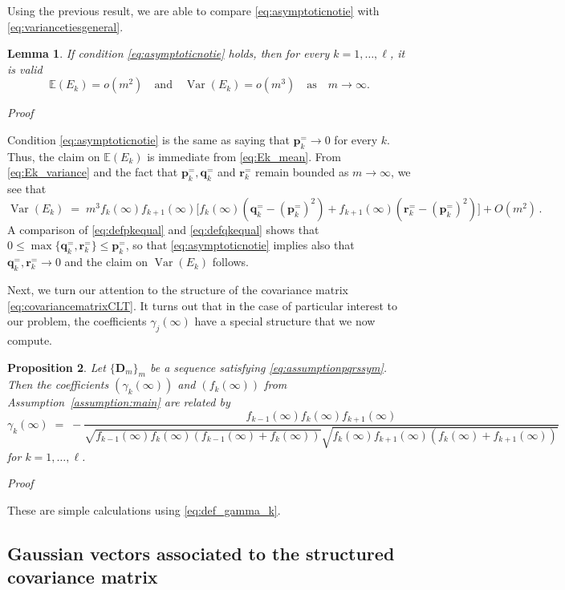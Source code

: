 \documentclass[reqno,a4paper,11pt]{amsart}
\makeatletter
\newtheorem{lemma}{Lemma}
\newtheorem{proposition}[lemma]{Proposition}
\theoremstyle{remark}
\newcommand{\mb}[1]{{\mathbf #1}}
\newcommand{\bb}[1]{{\mathbb #1}}
\numberwithin{equation}{section}
\newcommand{\var}[1]{\operatorname{Var}\left(#1\right)}
\renewenvironment{proof}[1][Proof]{\par
\pushQED{\qed}%
\normalfont \topsep6\p@\@plus6\p@\relax
\trivlist
\item\relax
{\itshape
#1\@addpunct{.}}\hspace\labelsep\ignorespaces
}{%
\popQED\endtrivlist\@endpefalse
}
\makeatother
\begin{document}
Using the previous result, we are able to compare \eqref{eq:asymptoticnotie} with \eqref{eq:variancetiesgeneral}.

\begin{lemma}\label{lem:notiemeanvariance}
If condition \eqref{eq:asymptoticnotie} holds, then for every $k=1,\hdots,\ell$, it is valid
$$
\bb E(E_k)= o(m^2)  \quad \text{and}\quad \var{E_k}= o(m^3) \quad \text{as}\quad m\to \infty.
$$
\end{lemma}
\begin{proof}
Condition \eqref{eq:asymptoticnotie} is the same as saying that $\bm p_k^=\to 0$ for every $k$. Thus, the claim on $\bb E(E_k)$ is immediate from \eqref{eq:Ek_mean}.
From \eqref{eq:Ek_variance} and the fact that $\mb p_k^=, \mb q_k^=$ and $\mb r_k^=$ remain bounded as $m\to\infty$, we see that
%
$$
\var{E_k}\;=\;
m^3 f_k(\infty)f_{k+1}(\infty)
\bigl[f_k(\infty)(\mb q_k^=-(\mb p_k^=)^2) + f_{k+1}(\infty)(\mb r_k^=-(\mb p_k^=)^2)\bigr]+O(m^2)\,.
$$
%
A comparison of \eqref{eq:defpkequal} and \eqref{eq:defqkequal} shows that $0\leq \max\{\mb q_k^=, \mb r_k^= \}\leq \mb p_k^=$, so that \eqref{eq:asymptoticnotie} implies also that $\mb q_k^=, \mb r_k^= \to 0$ and the claim on $\var{E_k}$ follows.
\end{proof}

Next, we turn our attention to the structure of the covariance matrix \eqref{eq:covariancematrixCLT}. It turns out that in the case of particular interest to our problem, the coefficients $\gamma_j(\infty)$ have a special structure that we now compute.

\begin{proposition}\label{prop:coeffgammak}
Let $\{\mb D_m\}_m$ be a sequence satisfying \eqref{eq:assumptionpqrssym}. Then the coefficients $(\gamma_k(\infty))$ and $(f_k(\infty))$ from Assumption~\ref{assumption:main} are related by
%
$$
\gamma_k(\infty)\;=\;-\frac{f_{k-1}(\infty)f_k(\infty)f_{k+1}(\infty)}{\sqrt{f_{k-1}(\infty)f_k(\infty)(f_{k-1}(\infty)+f_{k}(\infty))}\sqrt{f_{k}(\infty)f_{k+1}(\infty)(f_{k}(\infty)+f_{k+1}(\infty))}}
$$
%
for $k=1,\hdots,\ell$.
\end{proposition}
\begin{proof}
These are simple calculations using \eqref{eq:def_gamma_k}.
\end{proof}

\subsection{Gaussian vectors associated to the structured covariance matrix}\hfill 
\end{document}
